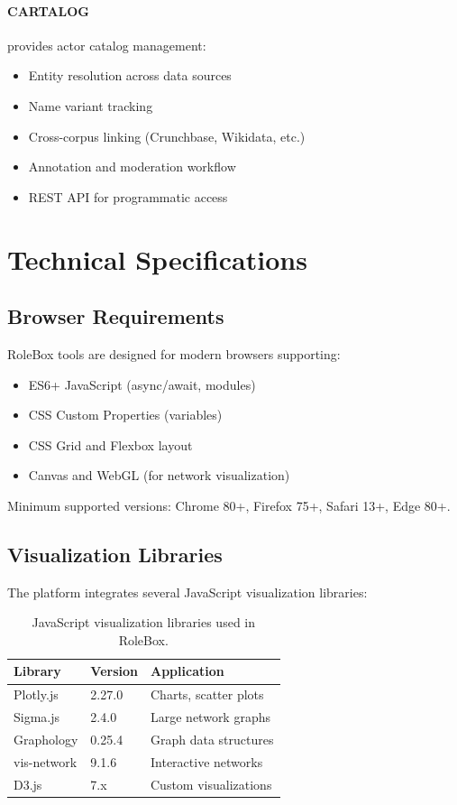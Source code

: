 \paragraph{CARTALOG} provides actor catalog management:
\begin{itemize}
    \item Entity resolution across data sources
    \item Name variant tracking
    \item Cross-corpus linking (Crunchbase, Wikidata, etc.)
    \item Annotation and moderation workflow
    \item REST API for programmatic access
\end{itemize}

\section{Technical Specifications}

\subsection{Browser Requirements}

RoleBox tools are designed for modern browsers supporting:
\begin{itemize}
    \item ES6+ JavaScript (async/await, modules)
    \item CSS Custom Properties (variables)
    \item CSS Grid and Flexbox layout
    \item Canvas and WebGL (for network visualization)
\end{itemize}

Minimum supported versions: Chrome 80+, Firefox 75+, Safari 13+, Edge 80+.

\subsection{Visualization Libraries}

The platform integrates several JavaScript visualization libraries:

\begin{table}[h]
\centering
\small
\begin{tabular}{lll}
\toprule
\textbf{Library} & \textbf{Version} & \textbf{Application} \\
\midrule
Plotly.js & 2.27.0 & Charts, scatter plots \\
Sigma.js & 2.4.0 & Large network graphs \\
Graphology & 0.25.4 & Graph data structures \\
vis-network & 9.1.6 & Interactive networks \\
D3.js & 7.x & Custom visualizations \\
\bottomrule
\end{tabular}
\caption{JavaScript visualization libraries used in RoleBox.}
\end{table}

